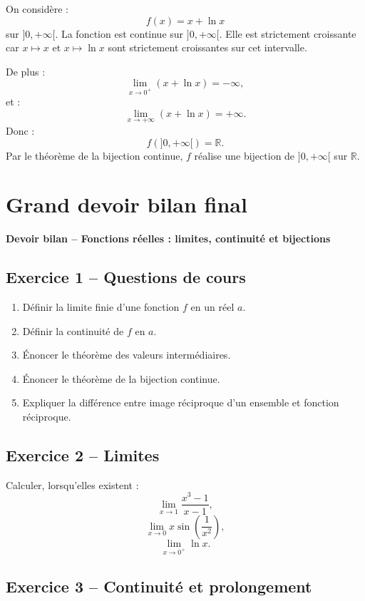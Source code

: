 \documentclass[11pt,a4paper]{article}
\newcommand{\R}{\mathbb R}
\begin{document}
\begin{correctionbox}[12]
On considère :
\[
f(x)=x+\ln x
\]
sur \(]0,+\infty[\).  
La fonction est continue sur \(]0,+\infty[\).  
Elle est strictement croissante car \(x\mapsto x\) et \(x\mapsto\ln x\) sont strictement croissantes sur cet intervalle.

De plus :
\[
\lim_{x\to0^+}(x+\ln x)=-\infty,
\]
et :
\[
\lim_{x\to+\infty}(x+\ln x)=+\infty.
\]
Donc :
\[
f(]0,+\infty[)=\R.
\]
Par le théorème de la bijection continue, \(f\) réalise une bijection de \(]0,+\infty[\) sur \(\R\).
\end{correctionbox}

\newpage
\section{Grand devoir bilan final}

\begin{center}
\Large\textbf{Devoir bilan -- Fonctions réelles : limites, continuité et bijections}
\end{center}

\subsection*{Exercice 1 -- Questions de cours}

\begin{enumerate}
    \item Définir la limite finie d'une fonction \(f\) en un réel \(a\).
    \item Définir la continuité de \(f\) en \(a\).
    \item Énoncer le théorème des valeurs intermédiaires.
    \item Énoncer le théorème de la bijection continue.
    \item Expliquer la différence entre image réciproque d'un ensemble et fonction réciproque.
\end{enumerate}

\subsection*{Exercice 2 -- Limites}

Calculer, lorsqu'elles existent :
\[
\lim_{x\to1}\frac{x^3-1}{x-1},
\]
\[
\lim_{x\to0}x\sin\left(\frac1{x^2}\right),
\]
\[
\lim_{x\to0^+}\ln x.
\]

\subsection*{Exercice 3 -- Continuité et prolongement}
\end{document}

